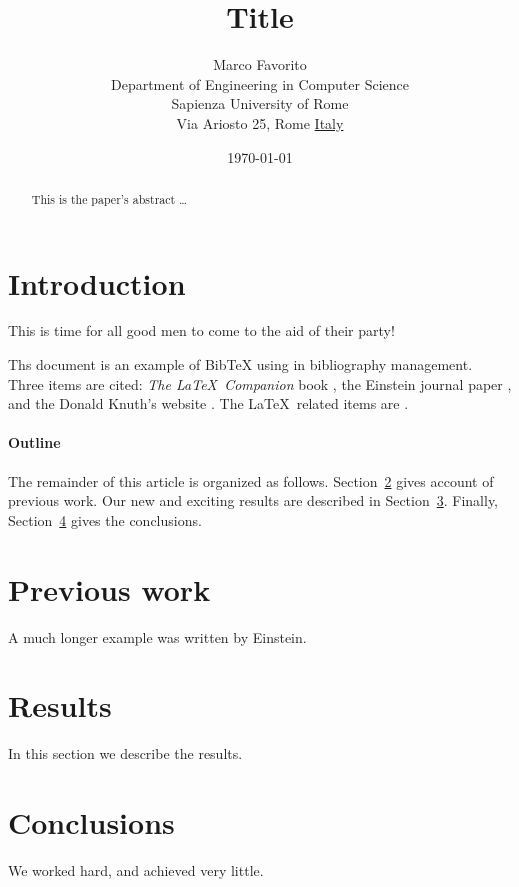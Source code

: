 \documentclass[12pt]{article}
\title{Title \LaTeXe{}}
\author{
        Marco Favorito \\
                Department of Engineering in Computer Science\\
                Sapienza University of Rome\\
                Via Ariosto 25, Rome \underline{Italy}
}
\date{\today}
\begin{document}

\maketitle

\begin{abstract}
This is the paper's abstract \ldots
\end{abstract}

\section{Introduction}
This is time for all good men to come to the aid of their party!

Ths document is an example of BibTeX using in bibliography management. Three items 
are cited: \textit{The \LaTeX\ Companion} book \cite{latexcompanion}, the Einstein
journal paper \cite{einstein}, and the Donald Knuth's website \cite{knuthwebsite}. 
The \LaTeX\ related items are \cite{latexcompanion,knuthwebsite}. 
 
\paragraph{Outline}
The remainder of this article is organized as follows.
Section~\ref{previous work} gives account of previous work.
Our new and exciting results are described in Section~\ref{results}.
Finally, Section~\ref{conclusions} gives the conclusions.

\section{Previous work}\label{previous work}
A much longer \LaTeXe{} example was written by Einstein\cite{einstein}.

\section{Results}\label{results}
In this section we describe the results.

\section{Conclusions}\label{conclusions}
We worked hard, and achieved very little.

\printbibliography
\end{document}
